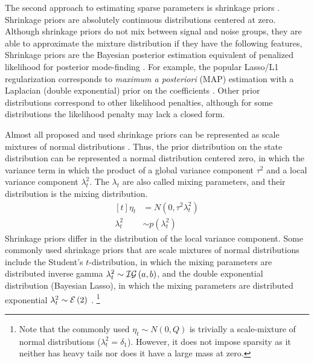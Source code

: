 \documentclass{article}
\begin{document}
The second approach to estimating sparse parameters is shrinkage priors \parencites{Tibshirani1996}{Tipping2001}.
Shrinkage priors are absolutely continuous distributions centered at zero.
Although shrinkage priors do not mix between signal and noise groups, they are able to approximate the mixture distribution if they have the following features,
Shrinkage priors are the Bayesian posterior estimation equivalent of penalized likelihood for posterior mode-finding \parencites{PolsonScott2010}{PolsonScott2012a}.
For example, the popular Lasso/L1 regularization \parencite{Tibshirani1996} corresponds to \textit{maximum a posteriori} (MAP) estimation with a Laplacian (double exponential) prior on the coefficients \parencites{ParkCasella2008}{Hans2009}.
Other prior distributions correspond to other likelihood penalties, although for some distributions the likelihood penalty may lack a closed form.

Almost all proposed and used shrinkage priors can be represented as scale mixtures of normal distributions \parencite{PolsonScott2010}.
Thus, the prior distribution on the state distribution can be represented a normal distribution centered zero, in which the variance term in which the product of a global variance component $\tau^{2}$ and a local variance component $\lambda_{t}^{2}$.
The $\lambda_t$ are also called mixing parameters, and their distribution is the mixing distribution.
\begin{equation}
  \label{eq:3}
  \begin{aligned}[t]
    \eta_{t} &= N(0, \tau^{2} \lambda_{t}^{2}) \\
    \lambda_{t}^{2} &\sim p(\lambda_{t}^{2})
  \end{aligned}
\end{equation}
Shrinkage priors differ in the distribution of the local variance component.%
Some commonly used shrinkage priors that are scale mixtures of normal distributions include the Student's $t$-distribution, in which the mixing parameters are distributed inverse gamma $\lambda^{2}_{t} \sim \mathcal{IG}\left(a, b\right)$, and the double exponential distribution (Bayesian Lasso), in which the mixing parameters are distributed exponential $\lambda^{2}_{t} \sim \mathcal{E}\left(2\right)$ \parencite[74]{CarvalhoPolsonScott2009}.
\footnote{
Note that the commonly used $\eta_{t} \sim N(0, Q)$ is trivially a scale-mixture of normal distributions ($\lambda_{t}^{2} = \delta_{1}$).
However, it does not impose sparsity as it neither has heavy tails nor does it have a large mass at zero.
}
\end{document}
